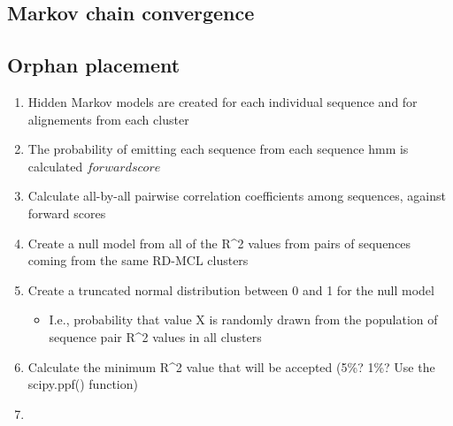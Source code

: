 \documentclass[twocolumn]{bmcart}%
\begin{document}
\subsection{Markov chain convergence}
\lipsum[3]


\subsection{Orphan placement}
\begin{enumerate}
  \item Hidden Markov models are created for each individual sequence and for alignements from each cluster
  \item The probability of emitting each sequence from each sequence hmm is calculated \(forward score\)
  \item Calculate all-by-all pairwise correlation coefficients among sequences, against forward scores
  \item Create a null model from all of the R\textasciicircum2 values from pairs of sequences coming from the same RD-MCL clusters
  \item Create a truncated normal distribution between 0 and 1 for the null model
    \begin{itemize}
    \item I.e., probability that value X is randomly drawn from the population of sequence pair R\textasciicircum2 values in all clusters
    \end{itemize}
  \item Calculate the minimum R\textasciicircum2 value that will be accepted (5\%? 1\%? Use the scipy.ppf() function)
  \item
\end{enumerate}


\end{document}

